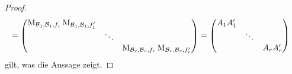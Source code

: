 \documentclass[a4paper,10pt]{scrartcl}
\begin{document}
\begin{proof}
\begin{align*}
    &=  \begin{pmatrix}
            \operatorname{M}_{\mathcal{B}_1, \mathcal{B}_1, f_1} \operatorname{M}_{\mathcal{B}_1, \mathcal{B}_1, f'_1}
          & {}
          & {}
          \\
            {}
          & \ddots
          & {}
          \\
            {}
          & {}
          & \operatorname{M}_{\mathcal{B}_r, \mathcal{B}_r, f_r} \operatorname{M}_{\mathcal{B}_r, \mathcal{B}_r, f'_r}
        \end{pmatrix}
     =  \begin{pmatrix}
          A_1 A'_1  &         &           \\
                    & \ddots  &           \\
                    &         & A_r A'_r
        \end{pmatrix}
  \end{align*}
  gilt, was die Aussage zeigt.
\end{proof}
\end{document}
